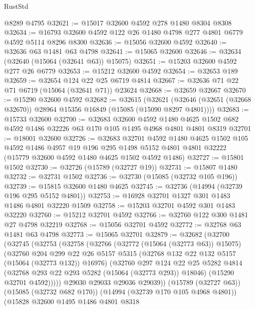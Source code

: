\begin{lexlean}{RustStd}
\begin{coremodule}
    @8289
    @4795
@32621 := @15017 @32600 @4592 @278 @1480 @8304 @8308
@32634 := @16793 @32600 @4592 @122 @26 @1480 @4798 @277 @4801 @6779 @4592 @5114 @8296 @8300
@32636 := @15056 @32600 @4592
@32640 := @32636 @63 @1481 @63 @4798
@32641 := @15065 @32600
@32646 := @32634 (@32640 (@15064 (@32641 @63)) @15075)
@32651 := @15203 @32600 @4592 @277 @26 @6779
@32653 := @15212 @32600 @4592
@32654 := @32653 @189
@32659 := @32654 @124 @22 @25 @6719 @4814
@32667 := @32636 @71 @22 @71 @6719 (@15064 (@32641 @71)) @23624
@32668 := @32659 @32667
@32670 := @15290 @32600 @4592
@32682 := @32615
    (@32621 (@32646 (@32651 (@32668 @32670)) @28964 @15356 @16849 (@15085 (@15090 @8297 @4801))))
@32683 := @15733 @32600
@32700 := @32683
    @32600
    @4592
    @1480
    @4625
    @1502
    @682
    @4592
    @1486
    @32226
    @63
    @170
    @105
    @1495
    @4968
    @4801
    @4801
    @8319
@32701 := @18001 @32600
@32726 := @32683
    @32701
    @4592
    @1480
    @4625
    @1502
    @105
    @4592
    @1486
    @4957
    @19
    @196
    @295
    @1498
    @5152
    @4801
    @4801
    @32222
    (@15779 @32600 @4592 @1480 @4625 @1502 @4592 @1486)
@32727 := @15801 @1502
@32730 := @32726 (@15789 (@32727 @19))
@32731 := @15807 @1480
@32732 := @32731 @1502
@32736 := @32730 (@15085 (@32732 @105 @196))
@32739 := @15815 @32600 @1480 @4625
@32745 := @32736 (@14994 (@32739 @196 @295 @5152 @4801))
@32753 := @16928 @32701 @1327 @301 @1483 @1486 @4801 @32220 @1509
@32758 := @15203 @32701 @4592 @301 @1483 @32220
@32760 := @15212 @32701 @4592
@32766 := @32760 @122 @300 @1481 @27 @4798 @32219
@32768 := @15056 @32701 @4592
@32772 := @32768 @63 @1481 @63 @4798
@32773 := @15065 @32701
@32879 := @32682
    (@32700
      (@32745
        (@32753
          (@32758
            (@32766
              (@32772 (@15064 (@32773 @63)) @15075)
              (@32760
                @204
                @299
                @22
                @26
                @5157
                @5315
                (@32768 @132 @22 @132 @5157 (@15064 (@32773 @132)) @16976)
                (@32760
                  @297
                  @124
                  @22
                  @25
                  @5282
                  @4814
                  (@32768 @293 @22 @293 @5282 (@15064 (@32773 @293)) @18046)
                  (@15290 @32701 @4592)))))
          @29030
          @29033
          @29036
          @29039))
      (@15789 (@32727 @63))
      (@15085 (@32732 @682 @170))
      (@14994 (@32739 @170 @105 @4968 @4801))
      (@15828
        @32600
        @1495
        @1486
        @4801
        @8318

\end{coremodule}
\end{lexlean}
